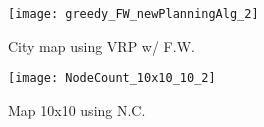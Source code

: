 \begin{figure}[h] 
  \label{fig:finalPaths} 
  \begin{minipage}[b]{0.55\linewidth}
    \centering
    \texttt{[image: greedy\_FW\_newPlanningAlg\_2]}
    \caption{City map using VRP w/ F.W.}
    \label{fig:cityMap_VRP_sim}
    \vspace{4ex}
  \end{minipage}
  \begin{minipage}[b]{0.5\linewidth}
    \centering
    \texttt{[image: NodeCount\_10x10\_10\_2]}
    \caption{Map 10x10 using N.C.}
    \label{fig:10x10_NC_sim}
    \vspace{4ex}%
  \end{minipage}
\end{figure}